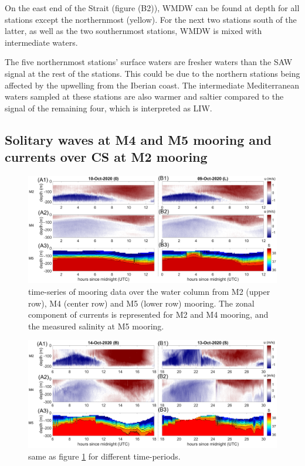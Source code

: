 On the east end of the Strait (figure (B2)), WMDW can be found at depth for all stations except the northernmost (yellow). For the next two stations south of the latter, as well as the two southernmost stations, WMDW is mixed with intermediate waters. 

The five northernmost stations' surface waters are fresher waters than the SAW signal at the rest of the stations. This could be due to the northern stations being affected by the upwelling from the Iberian coast. The intermediate Mediterranean waters sampled at these stations are also warmer and saltier compared to the signal of the remaining four, which is interpreted as LIW.


\subsection{Solitary waves at M4 and M5 mooring and currents over CS at M2 mooring}
\label{section_obs_moor}

\begin{figure}[!h]
 \includegraphics[width=\textwidth]{./GBR3D/US_moorings1.png}
 \caption {time-series of mooring data over the water column from M2 (upper row), M4 (center row) and M5 (lower row) mooring. The zonal component of currents is represented for M2 and M4 mooring, and the measured salinity at M5 mooring.}
 \label{fig_moor_US1}
\end{figure}

\begin{figure}[!h]
 \includegraphics[width=\textwidth]{./GBR3D/US_moorings2.png}
 \caption {same as figure \ref{fig_moor_US1} for different time-periods.}
 \label{fig_moor_US2}
\end{figure}

